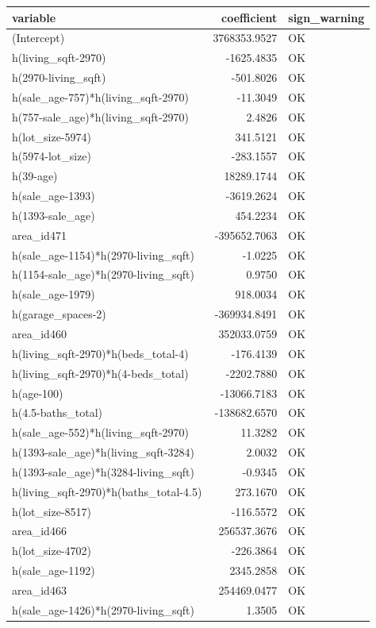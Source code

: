 \documentclass[
]{article}
\begin{document}
{\def\LTcaptype{} %
\begin{longtable}[]{@{}lrl@{}}
\toprule\noalign{}
variable & coefficient & sign\_warning \\
\midrule\noalign{}
\endhead
\bottomrule\noalign{}
\endlastfoot
(Intercept) & 3768353.9527 & OK \\
h(living\_sqft-2970) & -1625.4835 & OK \\
h(2970-living\_sqft) & -501.8026 & OK \\
h(sale\_age-757)*h(living\_sqft-2970) & -11.3049 & OK \\
h(757-sale\_age)*h(living\_sqft-2970) & 2.4826 & OK \\
h(lot\_size-5974) & 341.5121 & OK \\
h(5974-lot\_size) & -283.1557 & OK \\
h(39-age) & 18289.1744 & OK \\
h(sale\_age-1393) & -3619.2624 & OK \\
h(1393-sale\_age) & 454.2234 & OK \\
area\_id471 & -395652.7063 & OK \\
h(sale\_age-1154)*h(2970-living\_sqft) & -1.0225 & OK \\
h(1154-sale\_age)*h(2970-living\_sqft) & 0.9750 & OK \\
h(sale\_age-1979) & 918.0034 & OK \\
h(garage\_spaces-2) & -369934.8491 & OK \\
area\_id460 & 352033.0759 & OK \\
h(living\_sqft-2970)*h(beds\_total-4) & -176.4139 & OK \\
h(living\_sqft-2970)*h(4-beds\_total) & -2202.7880 & OK \\
h(age-100) & -13066.7183 & OK \\
h(4.5-baths\_total) & -138682.6570 & OK \\
h(sale\_age-552)*h(living\_sqft-2970) & 11.3282 & OK \\
h(1393-sale\_age)*h(living\_sqft-3284) & 2.0032 & OK \\
h(1393-sale\_age)*h(3284-living\_sqft) & -0.9345 & OK \\
h(living\_sqft-2970)*h(baths\_total-4.5) & 273.1670 & OK \\
h(lot\_size-8517) & -116.5572 & OK \\
area\_id466 & 256537.3676 & OK \\
h(lot\_size-4702) & -226.3864 & OK \\
h(sale\_age-1192) & 2345.2858 & OK \\
area\_id463 & 254469.0477 & OK \\
h(sale\_age-1426)*h(2970-living\_sqft) & 1.3505 & OK \\
\end{longtable}
}
\end{document}
